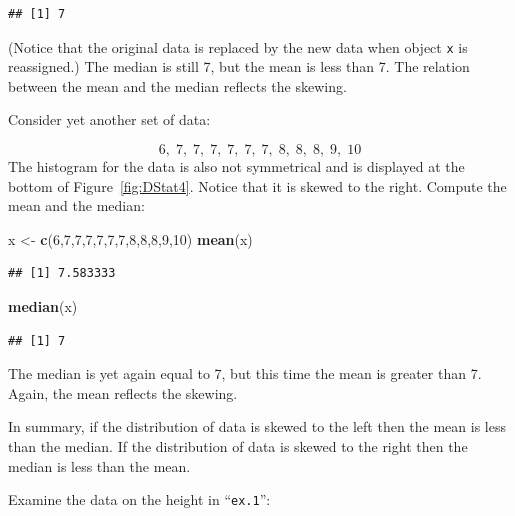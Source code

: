 \documentclass[
]{krantz}
\makeatletter
\newenvironment{Shaded}{\begin{snugshade}}{\end{snugshade}}
\newcommand{\DecValTok}[1]{\textcolor[rgb]{0.00,0.00,0.81}{#1}}
\newcommand{\FloatTok}[1]{\textcolor[rgb]{0.00,0.00,0.81}{#1}}
\newcommand{\KeywordTok}[1]{\textcolor[rgb]{0.13,0.29,0.53}{\textbf{#1}}}
\newcommand{\NormalTok}[1]{#1}
\newcommand{\OperatorTok}[1]{\textcolor[rgb]{0.81,0.36,0.00}{\textbf{#1}}}
\newcommand{\StringTok}[1]{\textcolor[rgb]{0.31,0.60,0.02}{#1}}
\newenvironment{kframe}{%
\medskip{}
\setlength{\fboxsep}{.8em}
 \def\at@end@of@kframe{}%
 \ifinner\ifhmode%
  \def\at@end@of@kframe{\end{minipage}}%
  \begin{minipage}{\columnwidth}%
 \fi\fi%
 \def\FrameCommand##1{\hskip\@totalleftmargin \hskip-\fboxsep
 \colorbox{shadecolor}{##1}\hskip-\fboxsep
     \hskip-\linewidth \hskip-\@totalleftmargin \hskip\columnwidth}%
 \MakeFramed {\advance\hsize-\width
   \@totalleftmargin\z@ \linewidth\hsize
   \@setminipage}}%
 {\par\unskip\endMakeFramed%
 \at@end@of@kframe}
\renewenvironment{Shaded}{\begin{kframe}}{\end{kframe}}
\theoremstyle{definition}
\theoremstyle{definition}
\theoremstyle{definition}
\theoremstyle{remark}
\makeatother
\begin{document}
\begin{verbatim}
## [1] 7
\end{verbatim}

(Notice that the original data is replaced by the new data when object
\texttt{x} is reassigned.) The median is still 7, but the mean is less than 7.
The relation between the mean and the median reflects the skewing.

Consider yet another set of data:

\[6,\;  7,\;  7,\;  7,\;  7,\;  7,\;  7,\;  8,\;  8,\;  8,\;  9,\;  10\]
The histogram for the data is also not symmetrical and is displayed at
the bottom of Figure~\ref{fig:DStat4}. Notice that it is
skewed to the right. Compute the mean and the median:

\begin{Shaded}
\begin{Highlighting}[]
\NormalTok{x <-}\StringTok{ }\KeywordTok{c}\NormalTok{(}\DecValTok{6}\NormalTok{,}\DecValTok{7}\NormalTok{,}\DecValTok{7}\NormalTok{,}\DecValTok{7}\NormalTok{,}\DecValTok{7}\NormalTok{,}\DecValTok{7}\NormalTok{,}\DecValTok{7}\NormalTok{,}\DecValTok{8}\NormalTok{,}\DecValTok{8}\NormalTok{,}\DecValTok{8}\NormalTok{,}\DecValTok{9}\NormalTok{,}\DecValTok{10}\NormalTok{)}
\KeywordTok{mean}\NormalTok{(x)}
\end{Highlighting}
\end{Shaded}

\begin{verbatim}
## [1] 7.583333
\end{verbatim}

\begin{Shaded}
\begin{Highlighting}[]
\KeywordTok{median}\NormalTok{(x)}
\end{Highlighting}
\end{Shaded}

\begin{verbatim}
## [1] 7
\end{verbatim}

The median is yet again equal to 7, but this time the mean is greater
than 7. Again, the mean reflects the skewing.

In summary, if the distribution of data is skewed to the left then the
mean is less than the median. If the distribution of data is skewed to
the right then the median is less than the mean.

Examine the data on the height in ``\texttt{ex.1}'':

\begin{Shaded}
\end{Shaded}
\end{document}
